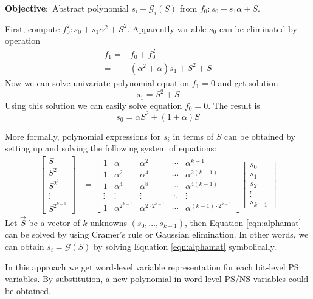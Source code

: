 \begin{Example}
{\bf Objective}:\ Abstract polynomial $s_i + \mathcal{G}_i(S)$ from $f_0: s_0+s_1\alpha+S$.

First, compute $f_0^2: s_0+s_1\alpha^2+S^2$. Apparently variable $s_0$ can be
eliminated by operation 
\begin{align}
f_1 =& f_0 + f_0^2 \nonumber\\
=&(\alpha^2+\alpha)s_1+S^2+S\nonumber
\end{align}
Now we can solve univariate polynomial equation $f_1 = 0$ and get solution
$$s_1 = S^2 + S$$
Using this solution we can easily solve equation $f_0 = 0$. The result is
$$s_0 = \alpha S^2+(1+\alpha)S$$
\end{Example}

More formally, polynomial expressions for $s_i$ in terms of $S$ can be
obtained by setting up and solving the following system of equations:
\begin{align}
\label{eqn:alphamat}
\begin{bmatrix}
S \\
S^2 \\
S^{2^2} \\
\vdots \\
S^{2^{k-1}}
\end{bmatrix}
&=
\begin{bmatrix}
1 & \alpha & \alpha^{2} & \cdots & \alpha^{{k-1}}\\
1 & \alpha^{2} & \alpha^{4} & \cdots & \alpha^{2(k-1)} \\
1 & \alpha^{4} & \alpha^{8} & \cdots & \alpha^{4(k-1)}\\
\vdots & \vdots & \vdots & \ddots & \vdots \\
1 & \alpha^{2^{k-1}} & \alpha^{2\cdot 2^{k-1}} & \cdots & \alpha^{(k-1)\cdot 2^{k-1}}
\end{bmatrix}
\begin{bmatrix}
s_0\\
s_1\\
s_2\\
\vdots\\
s_{k-1}
\end{bmatrix}
\end{align}
Let $\vec{S}$ be a vector of $k$ unknowns $(s_0,\dots,s_{k-1})$,
then Equation \ref{eqn:alphamat} can be solved by using Cramer's rule or Gaussian elimination.
In other words, we can obtain $s_i=\mathcal G(S)$ by solving Equation \ref{eqn:alphamat} symbolically.

In this approach we get word-level variable representation for each bit-level PS variables. 
By substitution, a new polynomial in word-level PS/NS variables could be obtained.

